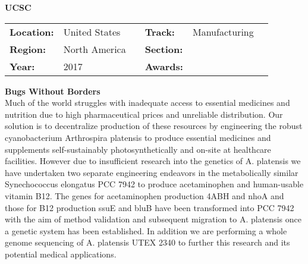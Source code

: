 \textbf{\uppercase{UCSC}} \FloatBarrier \begin{table}[h] \begin{tabular}{lp{2.5cm}llll} \textbf{Location:} & United States & \multicolumn{1}{|l}{} & \textbf{Track:}   & Manufacturing \\ \textbf{Region:}   & North America   & \multicolumn{1}{|l}{} & \textbf{Section:} &  \\ \textbf{Year:}     & 2017   & \multicolumn{1}{|l}{} & \textbf{Awards:}  & \end{tabular} \end{table} \FloatBarrier \noindent\textbf{Bugs Without Borders} \vspace{.2cm}\\ 
Much of the world struggles with inadequate access to essential medicines and nutrition due to high pharmaceutical prices and unreliable distribution. Our solution is to decentralize production of these resources by engineering the robust cyanobacterium Arthrospira platensis to produce essential medicines and supplements self-sustainably photosynthetically and on-site at healthcare facilities. However due to insufficient research into the genetics of A. platensis we have undertaken two separate engineering endeavors in the metabolically similar Synechococcus elongatus PCC 7942 to produce acetaminophen and human-usable vitamin B12. The genes for acetaminophen production 4ABH and nhoA and those for B12 production ssuE and bluB have been transformed into PCC 7942 with the aim of method validation and subsequent migration to A. platensis once a genetic system has been established.  In addition we are performing a whole genome sequencing of A. platensis UTEX 2340 to further this research and its potential medical applications.
\vspace{2cm}

